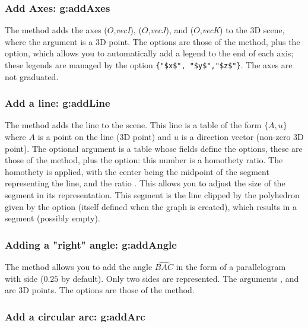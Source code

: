 \subsubsection{Add Axes: g:addAxes}

The  method adds the axes ($O$,\emph{vecI}), ($O$,\emph{vecJ}), and ($O$,\emph{vecK}) to the 3D scene, where the argument  is a 3D point. The options are those of the  method, plus the  option, which allows you to automatically add a legend to the end of each axis; these legends are managed by the option \verb|{"$x$", "$y$","$z$"}|. The axes are not graduated.

    
\subsubsection{Add a line: g:addLine}

The  method adds the line  to the scene. This line is a table of the form $\{A,u\}$ where $A$ is a point on the line (3D point) and $u$ is a direction vector (non-zero 3D point). The optional argument  is a table whose fields define the options, these are those of the  method, plus the  option: this number is a homothety ratio. The homothety is applied, with the center being the midpoint of the segment representing the line, and the ratio . This allows you to adjust the size of the segment in its representation. This segment is the line clipped by the polyhedron given by the  option (itself defined when the graph is created), which results in a segment (possibly empty).

\subsubsection{Adding a "right" angle: g:addAngle}

The  method allows you to add the angle $\widehat{BAC}$ in the form of a parallelogram with side  ($0.25$ by default). Only two sides are represented. The arguments ,  and  are 3D points. The options are those of the  method.

\subsubsection{Add a circular arc: g:addArc}

